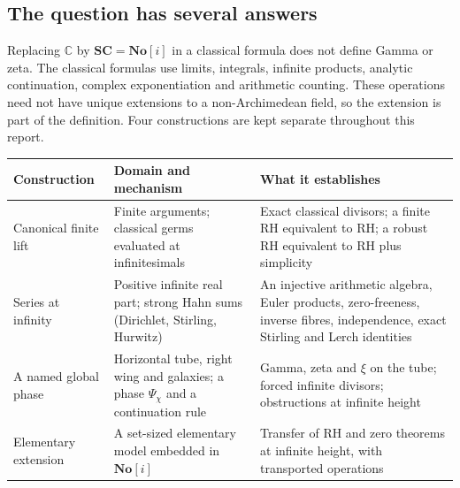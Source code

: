 \documentclass[11pt,a4paper]{article}
\numberwithin{equation}{section}
\theoremstyle{definition}
\theoremstyle{remark}
\newcommand{\No}{\mathbf{No}}
\newcommand{\SC}{\mathbf{SC}}
\newcommand{\C}{\mathbb C}
\begin{document}
\subsection{The question has several answers}\label{gz:sec:question}
Replacing $\C$ by $\SC=\No[i]$ in a classical formula does not define Gamma
or zeta. The classical formulas use limits, integrals, infinite products,
analytic continuation, complex exponentiation and arithmetic counting.
These operations need not have unique extensions to a non-Archimedean
field, so the extension is part of the definition. Four constructions are
kept separate throughout this report.
\begin{center}\small
\begin{tabular}{P{0.19\textwidth}P{0.34\textwidth}P{0.37\textwidth}}
\toprule
Construction & Domain and mechanism & What it establishes\\
\midrule
Canonical finite lift & Finite arguments; classical germs evaluated at infinitesimals & Exact classical divisors; a finite RH equivalent to RH; a robust RH equivalent to RH plus simplicity\\[2pt]
Series at infinity & Positive infinite real part; strong Hahn sums (Dirichlet, Stirling, Hurwitz) & An injective arithmetic algebra, Euler products, zero-freeness, inverse fibres, independence, exact Stirling and Lerch identities\\[2pt]
A named global phase & Horizontal tube, right wing and galaxies; a phase $\Psi_\chi$ and a continuation rule & Gamma, zeta and $\xi$ on the tube; forced infinite divisors; obstructions at infinite height\\[2pt]
Elementary extension & A set-sized elementary model embedded in $\No[i]$ & Transfer of RH and zero theorems at infinite height, with transported operations\\
\bottomrule
\end{tabular}
\end{center}
\end{document}
